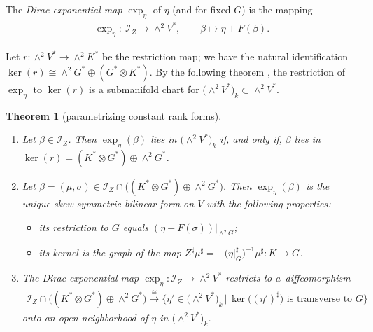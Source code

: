 \documentclass[pdftex]{sigma}
\numberwithin{equation}{section}
\newtheorem{Theorem}{Theorem}[section]
\begin{document}
\begin{Definition}\label{definition: Dirac exponential map}The \emph{Dirac exponential map} $\exp_{\eta}$ of $\eta$ (and for fixed $G$) is the mapping
\begin{gather*}{\exp_{\eta}}\colon \ \mathcal{I}_Z \to \wedge^2 V^*, \qquad \beta \mapsto \eta + F(\beta).\end{gather*}
\end{Definition}

Let $ r\colon {\wedge}^2 V^* \to {\wedge}^2 K^*$ be the restriction map; we have the natural identification $\ker(r) \cong \wedge^2 G^* \oplus (G^*\otimes K^*)$. By the following theorem \cite[Theorem~2.6]{SZPre}, the restriction of $\exp_{\eta}$ {to $\ker(r)$} is a submanifold chart for $\big({\wedge}^2 V^*\big)_k \subset \wedge^2 V^*$.

\begin{Theorem}[parametrizing constant rank forms]\label{theorem: almost Dirac structures}\quad
\begin{enumerate}\itemsep=0pt
\item[$(i)$] Let $\beta \in \mathcal{I}_Z$. Then $\exp_{\eta}(\beta)$ lies in $\big({\wedge}^2 V^*\big)_k$ if, and only if, $\beta$ lies in $\ker(r)=(K^*\otimes G^*)\oplus \wedge^2G^*$.

\item[$(ii)$] Let $\beta = (\mu,\sigma) \in \mathcal{I}_Z\cap \big((K^*\otimes G^*)\oplus \wedge^2G^*\big)$. Then $\exp_{\eta}(\beta)$ is the unique skew-symmetric bilinear form on $V$ with the following properties:
\begin{itemize}\itemsep=0pt
\item its restriction to $G$ equals $(\eta+F(\sigma))|_{\wedge^2G}$;
\item its kernel is the graph of the map $Z^\sharp \mu^\sharp= -\big(\eta\vert_G^{\sharp}\big)^{-1}\mu^\sharp\colon K\to G$.
\end{itemize}

\item[$(iii)$]The Dirac exponential map $\exp_{\eta}\colon \mathcal{I}_Z \to \wedge^2 V^*$ restricts to a~diffeomorphism
\begin{gather*}\mathcal{I}_Z \cap \big((K^*\otimes G^*)\oplus \wedge^2G^*\big) \stackrel{\cong}{\longrightarrow}
\big\{\eta' \in \big({\wedge}^2 V^*\big)_k\,|\, \ker\big({(\eta')^{\sharp}}\big) \text{ is transverse to $G$}\big\}\end{gather*}
onto an open neighborhood of $\eta$ in $\big({\wedge}^2 V^*\big)_k$.
\end{enumerate}
\end{Theorem}
\end{document}
